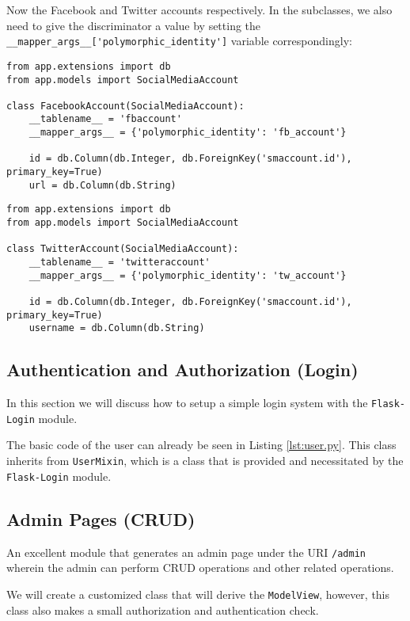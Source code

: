 \documentclass[../main/main.tex]{subfiles}
\begin{document}
Now the Facebook and Twitter accounts respectively. In the subclasses, we also
need to give the discriminator a value by setting the
\lstinline|__mapper_args__['polymorphic_identity']| variable correspondingly:

\begin{lstlisting}
from app.extensions import db
from app.models import SocialMediaAccount

class FacebookAccount(SocialMediaAccount):
    __tablename__ = 'fbaccount'
    __mapper_args__ = {'polymorphic_identity': 'fb_account'}

    id = db.Column(db.Integer, db.ForeignKey('smaccount.id'), primary_key=True)
    url = db.Column(db.String)
\end{lstlisting}

\begin{lstlisting}
from app.extensions import db
from app.models import SocialMediaAccount

class TwitterAccount(SocialMediaAccount):
    __tablename__ = 'twitteraccount'
    __mapper_args__ = {'polymorphic_identity': 'tw_account'}

    id = db.Column(db.Integer, db.ForeignKey('smaccount.id'), primary_key=True)
    username = db.Column(db.String)  
\end{lstlisting}

\subsection{Authentication and Authorization (Login)}
\label{sec:auth}

In this section we will discuss how to setup a simple login system
with the \lstinline|Flask-Login| module. 

The basic code of the user can already be seen in Listing
\ref{lst:user.py}. This class inherits from \lstinline|UserMixin|,
which is a class that is provided and necessitated by the
\lstinline|Flask-Login| module. 

\subsection{Admin Pages (CRUD)}

An excellent module that generates an admin page under the URI
\lstinline|/admin| wherein the admin can perform CRUD operations and
other related operations. 

We will create a customized class that will derive the
\lstinline|ModelView|, however, this class also makes a small
authorization and authentication check. 
\end{document}
